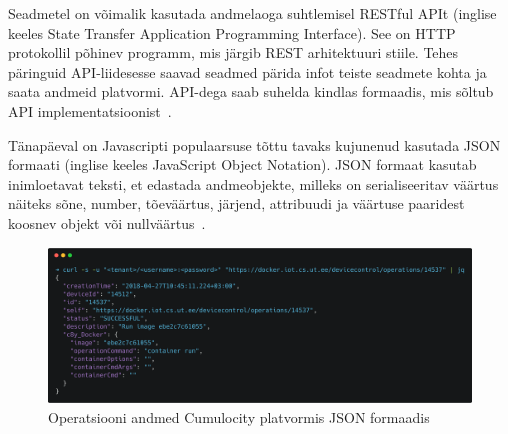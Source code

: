 \documentclass[12pt]{article}
\begin{document}
  Seadmetel on võimalik kasutada andmelaoga suhtlemisel RESTful APIt
  (inglise keeles State Transfer Application Programming Interface). See on HTTP protokollil põhinev
  programm, mis järgib REST arhitektuuri stiile. Tehes päringuid API-liidesesse saavad seadmed pärida
  infot teiste seadmete kohta ja saata andmeid platvormi. API-dega saab suhelda kindlas formaadis,
  mis sõltub API implementatsioonist~\cite{cumulocityRestDocumentation}.

  Tänapäeval on Javascripti populaarsuse tõttu tavaks kujunenud kasutada JSON formaati
  (inglise keeles JavaScript Object Notation). JSON formaat kasutab inimloetavat teksti, et edastada andmeobjekte,
  milleks on serialiseeritav väärtus näiteks sõne, number, tõeväärtus, järjend, attribuudi ja väärtuse paaridest
  koosnev objekt või nullväärtus~\cite{JSON}. 


  \begin{figure} [ht] %
  \begin{center}
  \includegraphics[width=1\textwidth]{operation14537}
  \caption{Operatsiooni andmed Cumulocity platvormis JSON formaadis}
  \label{fig:operation14537}
  \end{center}
  \end{figure}
\end{document}
